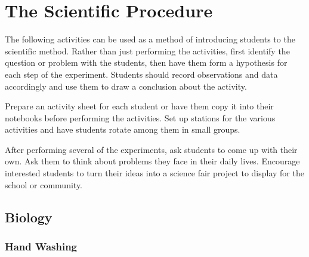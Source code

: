 \chapter{The Scientific Procedure} 
\label{cha:scientific-procedure}

The following activities can be used as a method of introducing students to the scientific method. Rather than just performing the activities, first identify the question or problem with the students, then have them form a hypothesis for each step of the experiment. Students should record observations and data accordingly and use them to draw a conclusion about the activity.

Prepare an activity sheet for each student or have them copy it into their notebooks before performing the activities. Set up stations for the various activities and have students rotate among them in small groups.

After performing several of the experiments, ask students to come up with their own. Ask them to think about problems they face in their daily lives. Encourage interested students to turn their ideas into a science fair project to display for the school or community.


\section{Biology}


\subsection{Hand Washing}


